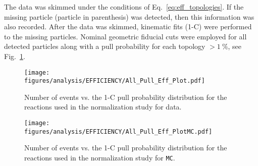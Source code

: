 \documentclass[11pt,a4paper]{article}
\newcommand{\abbr}[1]{\textsc{\texttt{#1}}}
\def\figures{/Users/michaelkunkel/WORK/GIT_HUB/THESIS/figures/print}
\newlength{\figwidth}
\newlength{\hfigheight}
\begin{document}
	The data was skimmed under the conditions of Eq.~\ref{eq:eff_topologies}. If the missing particle (particle in parenthesis) was detected, then this information was also recorded. After the data was skimmed, kinematic fits (1-C) were performed to the missing particles. Nominal geometric fiducial cuts were employed for all detected particles along with a pull probability for each topology  $>1~\%$, see Fig.~\ref{fig:eff_pull}.
	\begin{figure}[h!]\begin{center}
			\texttt{[image: \\figures/analysis/EFFICIENCY/All\_Pull\_Eff\_Plot.pdf]}
			\caption[Number of events vs. the pull distribution for the reactions used in the normalization study for data]{\label{fig:eff_pull}Number of events vs. the 1-C pull probability distribution for the reactions used in the normalization study for data.}
		\end{center}\end{figure}
		\begin{figure}[h!]\begin{center}
				\texttt{[image: \\figures/analysis/EFFICIENCY/All\_Pull\_Eff\_PlotMC.pdf]}
				\caption[Number of events vs. the pull distribution for the reactions used in the normalization study for \abbr{MC}]{\label{fig:eff_pullMC} Number of events vs. the 1-C pull probability distribution for the reactions used in the normalization study for \abbr{MC}.}
			\end{center}\end{figure}
			
\end{document}

